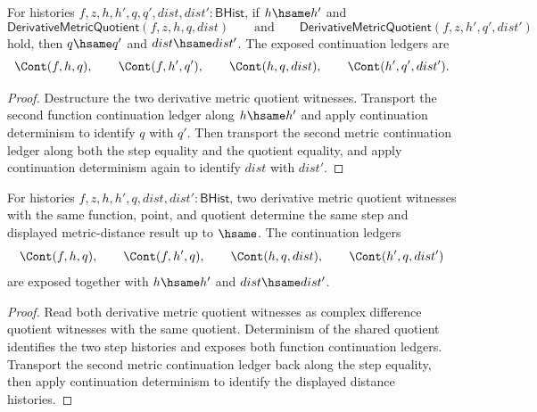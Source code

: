 \begin{theorem}
\label{thm:derivative-metric-quotient-hsame-step-result-deterministic}
For histories $f,z,h,h',q,q',dist,dist':\mathsf{BHist}$, if
$h\hsame h'$ and
$$
\mathsf{DerivativeMetricQuotient}(f,z,h,q,dist)
\qquad\text{and}\qquad
\mathsf{DerivativeMetricQuotient}(f,z,h',q',dist')
$$
hold, then $q\hsame q'$ and $dist\hsame dist'$. The exposed continuation
ledgers are
$$
\Cont(f,h,q),\qquad \Cont(f,h',q'),\qquad \Cont(h,q,dist),\qquad
\Cont(h',q',dist').
$$
\end{theorem}
\begin{proof}
Destructure the two derivative metric quotient witnesses. Transport the second
function continuation ledger along $h\hsame h'$ and apply continuation
determinism to identify $q$ with $q'$. Then transport the second metric
continuation ledger along both the step equality and the quotient equality, and
apply continuation determinism again to identify $dist$ with $dist'$.
\end{proof}

\begin{theorem}
\label{thm:derivative-metric-quotient-same-quotient-step-distance-deterministic}
For histories $f,z,h,h',q,dist,dist':\mathsf{BHist}$, two derivative metric
quotient witnesses with the same function, point, and quotient determine the
same step and displayed metric-distance result up to $\hsame$. The
continuation ledgers
$$
\Cont(f,h,q),\qquad \Cont(f,h',q),\qquad \Cont(h,q,dist),\qquad
\Cont(h',q,dist')
$$
are exposed together with $h\hsame h'$ and $dist\hsame dist'$.
\end{theorem}
\begin{proof}
Read both derivative metric quotient witnesses as complex difference quotient
witnesses with the same quotient. Determinism of the shared quotient identifies
the two step histories and exposes both function continuation ledgers.
Transport the second metric continuation ledger back along the step equality,
then apply continuation determinism to identify the displayed distance
histories.
\end{proof}

